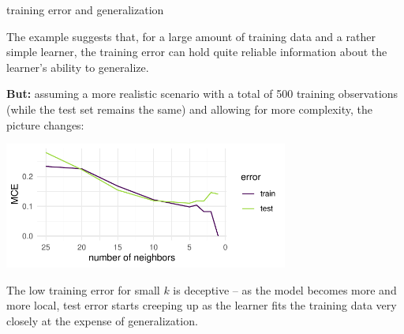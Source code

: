 \begin{vbframe}{training error and generalization}
\framebreak


\small

The example suggests that, for a large amount of training data and a rather
simple learner, the training error can hold quite reliable information about 
the learner's ability to generalize.

\vfill

\textbf{But:} assuming a more realistic scenario with a total of 500 training
observations (while the test set remains the same) and allowing for more 
complexity, the picture changes:

\vfill

\begin{center}
\includegraphics[width = 0.7\textwidth]{figure/eval_delta_train_test_overfit}
\end{center}

\vfill

The low training error for small $k$ is deceptive -- as the model becomes more 
and more local, test error starts creeping up as the learner fits the 
training data very closely at the expense of generalization.

\end{vbframe}


\endlecture


